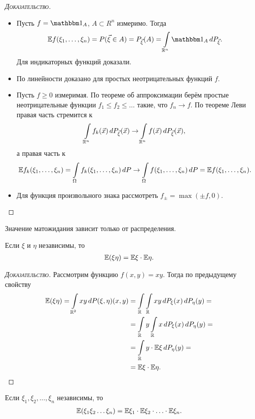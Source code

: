 \begin{proof}[\normalfont\textsc{Доказательство}]\
 \begin{itemize}
  \item Пусть $ f = \Ind_A $, $ A \subset R^{n} $ измеримо. Тогда
   \begin{align*}
    \E f (\xi_1, \ldots, \xi_n) = P(\vec\xi \in A) = P_{\vec\xi}(A) = \int\limits_{\R^{n}} \Ind_A\,dP_{\vec\xi}.
   \end{align*}  Для индикаторных функций доказали.
  \item По линейности доказано для простых неотрицательных функций $ f $.
  \item Пусть $ f \geqslant 0 $ измеримая. По теореме об аппроксимации берём простые неотрицательные функции $ f_1 \leqslant f_2 \leqslant \ldots $ такие, что $ f_n \to f $. По теореме Леви правая часть стремится к
   \begin{align*}
    \int\limits_{\mathbb{R}^{n}} f_k(\vec x)  \,dP_{\vec\xi}(\vec x) \to \int\limits_{\mathbb{R}^{n}} f(\vec x)\,dP_{\vec\xi} (\vec x),
   \end{align*} а правая часть к
   \begin{align*}
    \mathbb E f_k (\xi_1, \ldots, \xi_n) = \int\limits_{\Omega} f_k(\xi_1, \ldots, \xi_n) \,dP \to \int\limits_{\Omega} f(\xi_1, \ldots, \xi_n)\,dP = \mathbb E f(\xi_1, \ldots, \xi_n).
   \end{align*} 
  \item Для функция произвольного знака рассмотреть $ f_\pm = \max(\pm f, 0) $.
 \end{itemize}
\end{proof}
\begin{crly*}
 Значение матожидания зависит только от распределения.
\end{crly*}
\begin{prop}
 \label{proposition:independent_expected_product}
 Если $ \xi $ и $ \eta $ независимы, то
 \begin{align*}
  \mathbb E(\xi \eta) = \mathbb E\xi \cdot \mathbb E\eta.
 \end{align*} 
\end{prop}
\begin{proof}[\normalfont\textsc{Доказательство}]
 Рассмотрим функцию $ f(x,y) = xy $. Тогда по предыдущему свойству
 \begin{align*}
  \mathbb E(\xi\eta) = \int\limits_{\mathbb{R}^{2}} xy \,dP{(\xi,\eta)} (x,y) &= \int\limits_{\mathbb{R}} \int\limits_{\mathbb{R}} xy\,dP_{\xi}(x)\,dP_{\eta}(y) = \\
  &= \int\limits_{\mathbb{R}} y \int\limits_{\mathbb{R}} x\,dP_{\xi}(x)\,dP_{\eta}(y) = \\
  &= \int\limits_{\mathbb{R}} y \cdot \mathbb E\xi\,dP_{\eta}(y) = \\
  &= \mathbb E\xi \cdot \mathbb E\eta.
 \end{align*} 
\end{proof}
\begin{prop*}
 Если $ \xi_1,\xi_2, \ldots, \xi_n $ независимы, то
 \begin{align*}
  \mathbb E(\xi_1 \xi_2 \ldots \xi_n) = \mathbb E\xi_1 \cdot \mathbb E\xi_2 \cdot \ldots \cdot \mathbb E\xi_n.
 \end{align*} 
\end{prop*}

